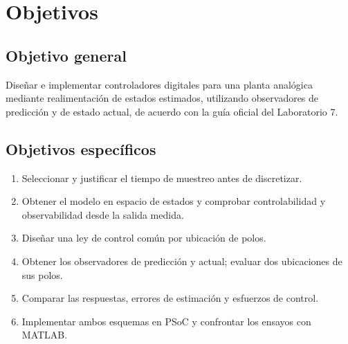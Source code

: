 \section{Objetivos}
\subsection{Objetivo general}
Diseñar e implementar controladores digitales para una planta analógica mediante
realimentación de estados estimados, utilizando observadores de predicción y de
estado actual, de acuerdo con la guía oficial del Laboratorio 7.

\subsection{Objetivos específicos}
\begin{enumerate}
\item Seleccionar y justificar el tiempo de muestreo antes de discretizar.
\item Obtener el modelo en espacio de estados y comprobar controlabilidad y observabilidad desde la salida medida.
\item Diseñar una ley de control común por ubicación de polos.
\item Obtener los observadores de predicción y actual; evaluar dos ubicaciones de sus polos.
\item Comparar las respuestas, errores de estimación y esfuerzos de control.
\item Implementar ambos esquemas en PSoC y confrontar los ensayos con MATLAB.
\end{enumerate}
